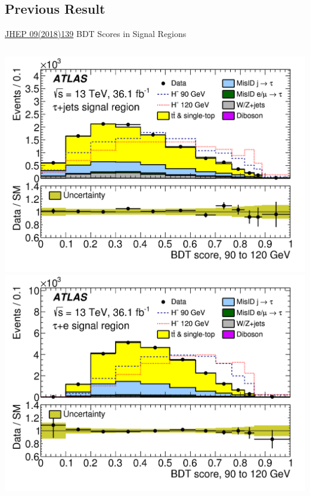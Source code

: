 \documentclass[aspectratio=169,xcolor=table]{beamer}
\begin{document}
  \subsection{Previous Result}

    \begin{frame}[t]{\href{https://link.springer.com/article/10.1007/JHEP09(2018)139}{JHEP 09(2018)139} BDT Scores in Signal Regions}
        \begin{columns}[t]
          \includegraphics[height=.4\textheight,keepaspectratio=true]{taujet_SR_2018/taujet_SR_90to120_2018.png}
          \includegraphics[height=.4\textheight,keepaspectratio=true]{tauel_SR_2018/tauel_SR_90to120_2018.png}


\end{columns}
\end{frame}
\end{document}
